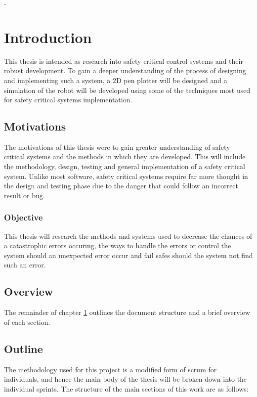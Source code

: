 -\chapter{Introduction}
	\label{chap:intro}
	
	This thesis is intended as research into safety critical control systems and their robust development. To gain a deeper understanding of the process of designing and implementing such a system, a 2D pen plotter will be designed and a simulation of the robot will be developed using some of the techniques most used for safety critical systems implementation.
	
	\section{Motivations}
		\label{sec:intro_motivation} 
		
		The motivations of this thesis were to gain greater understanding of safety critical systems and the methods in which they are developed. This will include the methodology, design, testing and general implementation of a safety critical system. Unlike most software, safety critical systems require far more thought in the design and testing phase due to the danger that could follow an incorrect result or bug. 
	
	\subsection{Objective}
		\label{sec:intro_objective} 
		
		This thesis will research the methods and systems used to decrease the chances of a catastrophic errors occuring, the ways to handle the errors or control the system should an unexpected error occur and fail safes should the system not find such an error.
		
	\section{Overview}  
		\label{sec:intro_overview} 
		
		The remainder of chapter \ref{chap:intro} outlines the document structure and a brief overview of each section.

	\section{Outline} 
		\label{sec:intro_outline} 
		
		The methodology used for this project is a modified form of scrum for individuals, and hence the main body of the thesis will be broken down into the individual sprints. The structure of the main sections of this work are as follows:
		

